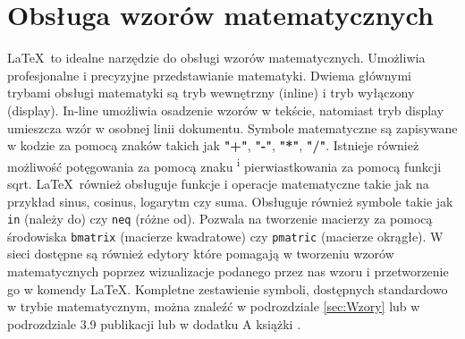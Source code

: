 \section{Obsługa wzorów matematycznych}
\LaTeX\ to idealne narzędzie do obsługi wzorów matematycznych. Umożliwia profesjonalne i precyzyjne przedstawianie matematyki. Dwiema głównymi trybami obsługi matematyki są tryb wewnętrzny (inline) i tryb wyłączony (display). In-line umożliwia osadzenie wzorów w tekście, natomiast tryb display umieszcza wzór w osobnej linii dokumentu. Symbole matematyczne  są zapisywane w kodzie za pomocą znaków takich jak \textbf{"+"}, \textbf{"-"}, \textbf{"*"}, \textbf{"/"}. Istnieje również możliwość potęgowania za pomocą znaku \textsuperscript i pierwiastkowania za pomocą funkcji sqrt. \LaTeX\ również obsługuje funkcje i operacje matematyczne takie jak na przykład sinus, cosinus, logarytm czy suma. Obsługuje również symbole takie jak \texttt{in} (należy do) czy \texttt{neq} (różne od). Pozwala na tworzenie macierzy za pomocą środowiska \texttt{bmatrix} (macierze kwadratowe) czy \texttt{pmatric} (macierze okrągłe). W sieci dostępne są również edytory które pomagają w tworzeniu wzorów matematycznych poprzez wizualizacje podanego przez nas wzoru i przetworzenie go w komendy \LaTeX. Kompletne zestawienie symboli, dostępnych standardowo w trybie matematycznym,
można znaleźć w podrozdziale \ref{sec:Wzory} lub w podrozdziale 3.9 publikacji \cite{oetiker2022nie} lub w dodatku A książki
\cite{diller2001latex}.
